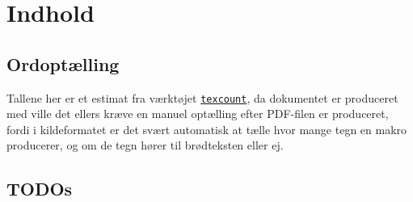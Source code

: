 \documentclass[../main]{subfiles}
\begin{document}
\chapter{Indhold}


\section{Ordoptælling}
    Tallene her er et estimat fra værktøjet \href{https://ctan.org/pkg/texcount}{\texttt{texcount}}, da dokumentet er produceret med  ville det ellers kræve en manuel optælling efter PDF-filen er produceret, fordi i kildeformatet er det svært automatisk at tælle hvor mange tegn en makro producerer, og om de tegn hører til brødteksten eller ej.


\section{TODOs}
    \listoftodos


\clearpage
\tableofcontents
\end{document}
